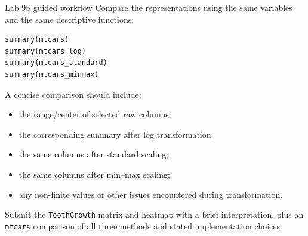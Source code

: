 \begin{labproject}{Lab 9b guided workflow}
Compare the representations using the same variables and the same descriptive functions:

\begin{lstlisting}[style=dsr]
summary(mtcars)
summary(mtcars_log)
summary(mtcars_standard)
summary(mtcars_minmax)
\end{lstlisting}

A concise comparison should include:
\begin{itemize}
  \item the range/center of selected raw columns;
  \item the corresponding summary after log transformation;
  \item the same columns after standard scaling;
  \item the same columns after min--max scaling;
  \item any non-finite values or other issues encountered during transformation.
\end{itemize}
\end{labproject}

\begin{labdeliverable}
Submit the \texttt{ToothGrowth} matrix and heatmap with a brief interpretation, plus an \texttt{mtcars} comparison of all three methods and stated implementation choices.
\end{labdeliverable}
